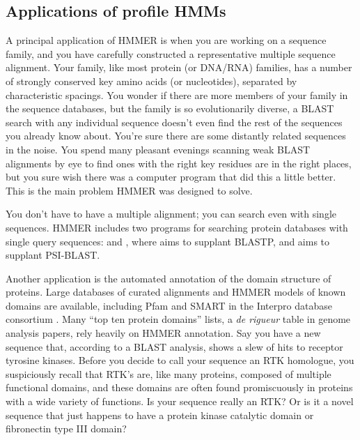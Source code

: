 \subsection{Applications of profile HMMs}

A principal application of HMMER is when you are working on a sequence
family, and you have carefully constructed a representative multiple
sequence alignment. Your family, like most protein (or DNA/RNA)
families, has a number of strongly conserved key amino acids (or
nucleotides), separated by characteristic spacings. You wonder if
there are more members of your family in the sequence databases, but
the family is so evolutionarily diverse, a BLAST search with any
individual sequence doesn't even find the rest of the sequences you
already know about. You're sure there are some distantly related
sequences in the noise. You spend many pleasant evenings scanning weak
BLAST alignments by eye to find ones with the right key residues are
in the right places, but you sure wish there was a computer program
that did this a little better. This is the main problem HMMER was
designed to solve.

You don't have to have a multiple alignment; you can search even with
single sequences. HMMER includes two programs for searching protein
databases with single query sequences:  and
, where  aims to supplant BLASTP, and
 aims to supplant PSI-BLAST.

Another application is the automated annotation of the domain
structure of proteins. Large databases of curated alignments and HMMER
models of known domains are available, including Pfam
\citep{FinnBateman16} and SMART \citep{Letunic12} in the Interpro
database consortium \citep{MitchellFinn15}. Many ``top ten protein
domains'' lists, a \emph{de rigueur} table in genome analysis papers,
rely heavily on HMMER annotation.  Say you have a new sequence that,
according to a BLAST analysis, shows a slew of hits to receptor
tyrosine kinases. Before you decide to call your sequence an RTK
homologue, you suspiciously recall that RTK's are, like many proteins,
composed of multiple functional domains, and these domains are often
found promiscuously in proteins with a wide variety of functions. Is
your sequence really an RTK? Or is it a novel sequence that just
happens to have a protein kinase catalytic domain or fibronectin type
III domain?


